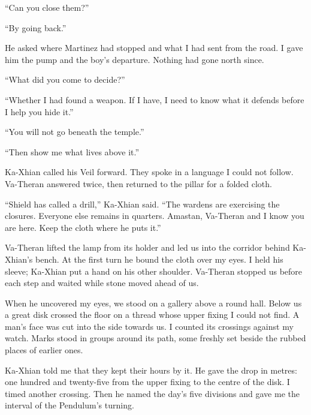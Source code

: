``Can you close them?''\par

``By going back.''\par

He asked where Martinez had stopped and what I had sent from the road. I gave him the pump and the boy's departure. Nothing had gone north since.\par

``What did you come to decide?''\par

``Whether I had found a weapon. If I have, I need to know what it defends before I help you hide it.''\par

``You will not go beneath the temple.''\par

``Then show me what lives above it.''\par

Ka-Xhian called his Veil forward. They spoke in a language I could not follow. Va-Theran answered twice, then returned to the pillar for a folded cloth.\par

``Shield has called a drill,'' Ka-Xhian said. ``The wardens are exercising the closures. Everyone else remains in quarters. Amastan, Va-Theran and I know you are here. Keep the cloth where he puts it.''\par

Va-Theran lifted the lamp from its holder and led us into the corridor behind Ka-Xhian's bench. At the first turn he bound the cloth over my eyes. I held his sleeve; Ka-Xhian put a hand on his other shoulder. Va-Theran stopped us before each step and waited while stone moved ahead of us.\par

When he uncovered my eyes, we stood on a gallery above a round hall. Below us a great disk crossed the floor on a thread whose upper fixing I could not find. A man's face was cut into the side towards us. I counted its crossings against my watch. Marks stood in groups around its path, some freshly set beside the rubbed places of earlier ones.\par

Ka-Xhian told me that they kept their hours by it. He gave the drop in metres: one hundred and twenty-five from the upper fixing to the centre of the disk. I timed another crossing. Then he named the day's five divisions and gave me the interval of the Pendulum's turning.\par

